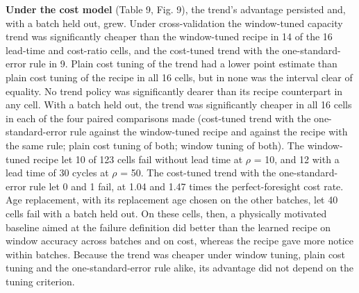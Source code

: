 \documentclass[a4paper,fleqn,doubleblind]{cas-dc}
\begin{document}
\textbf{Under the cost model} (Table 9, Fig. 9), the trend's advantage persisted and, with a batch held out, grew. Under cross-validation the window-tuned capacity trend was significantly cheaper than the window-tuned recipe in 14 of the 16 lead-time and cost-ratio cells, and the cost-tuned trend with the one-standard-error rule in 9. Plain cost tuning of the trend had a lower point estimate than plain cost tuning of the recipe in all 16 cells, but in none was the interval clear of equality. No trend policy was significantly dearer than its recipe counterpart in any cell. With a batch held out, the trend was significantly cheaper in all 16 cells in each of the four paired comparisons made (cost-tuned trend with the one-standard-error rule against the window-tuned recipe and against the recipe with the same rule; plain cost tuning of both; window tuning of both). The window-tuned recipe let 10 of 123 cells fail without lead time at $\rho$ = 10, and 12 with a lead time of 30 cycles at $\rho$ = 50. The cost-tuned trend with the one-standard-error rule let 0 and 1 fail, at 1.04 and 1.47 times the perfect-foresight cost rate. Age replacement, with its replacement age chosen on the other batches, let 40 cells fail with a batch held out. On these cells, then, a physically motivated baseline aimed at the failure definition did better than the learned recipe on window accuracy across batches and on cost, whereas the recipe gave more notice within batches. Because the trend was cheaper under window tuning, plain cost tuning and the one-standard-error rule alike, its advantage did not depend on the tuning criterion.
\end{document}

